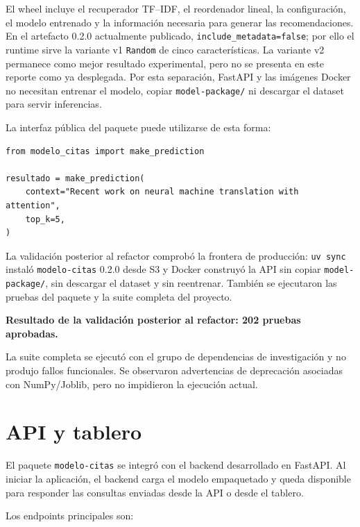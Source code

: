 \documentclass[9pt]{article}
\newcommand{\notabox}[1]{
\begin{tcolorbox}[
    colback=lightgray,
    colframe=accentblue,
    boxrule=0.5pt,
    left=5pt,
    right=5pt,
    top=3pt,
    bottom=3pt,
    arc=1pt
]
\footnotesize #1
\end{tcolorbox}
}
\begin{document}
El wheel incluye el recuperador TF--IDF, el reordenador lineal, la
configuración, el modelo entrenado y la información necesaria para generar las
recomendaciones. En el artefacto 0.2.0 actualmente publicado,
\texttt{include\_metadata=false}; por ello el runtime sirve la variante v1
\texttt{Random} de cinco características. La variante v2 permanece como mejor
resultado experimental, pero no se presenta en este reporte como ya desplegada.
Por esta separación, FastAPI y las imágenes Docker no necesitan entrenar el
modelo, copiar \texttt{model-package/} ni descargar el dataset para servir
inferencias.

La interfaz pública del paquete puede utilizarse de esta forma:

\begin{verbatim}
from modelo_citas import make_prediction

resultado = make_prediction(
    context="Recent work on neural machine translation with attention",
    top_k=5,
)
\end{verbatim}

La validación posterior al refactor comprobó la frontera de producción:
\texttt{uv sync} instaló \texttt{modelo-citas} 0.2.0 desde S3 y Docker construyó
la API sin copiar \texttt{model-package/}, sin descargar el dataset y sin
reentrenar. También se ejecutaron las pruebas del paquete y la suite completa
del proyecto.

\notabox{
\textbf{Resultado de la validación posterior al refactor: 202 pruebas aprobadas.}

La suite completa se ejecutó con el grupo de dependencias de investigación y no
produjo fallos funcionales. Se observaron advertencias de deprecación asociadas
con NumPy/Joblib, pero no impidieron la ejecución actual.
}


\section{API y tablero}

El paquete \texttt{modelo-citas} se integró con el backend desarrollado en
FastAPI. Al iniciar la aplicación, el backend carga el modelo empaquetado y
queda disponible para responder las consultas enviadas desde la API o desde el
tablero.

Los endpoints principales son:
\end{document}
